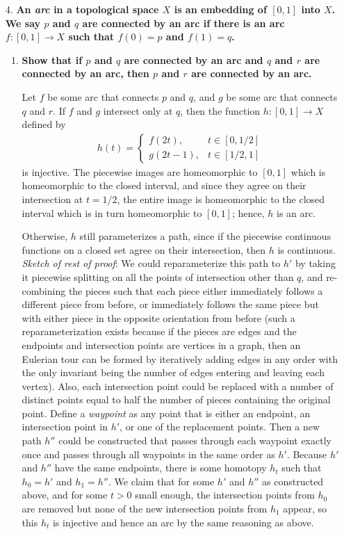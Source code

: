 \documentclass[a4paper,12pt]{article}
\begin{document}
\begin{enumerate}
    \item[4.]
        \boldmath\textbf{An \emph{arc} in a topological space $X$ is an embedding of $[0, 1]$ into $X$. We say $p$ and $q$ are connected by an arc if there is an arc $f : [0, 1] \to X$ such that $f(0) = p$ and $f(1) = q$.
        }\unboldmath \par
        \begin{enumerate}
            \item
                \boldmath\textbf{Show that if $p$ and $q$ are connected by an arc and $q$ and $r$ are connected by an arc, then $p$ and $r$ are connected by an arc.
                }\unboldmath \par
                Let $f$ be some arc that connects $p$ and $q$, and $g$ be some arc that connects $q$ and $r$. If $f$ and $g$ intersect only at $q$, then the function $h : [0, 1] \to X$ defined by
                \begin{align*}
                    h(t) = \begin{cases}
                        f(2t), &t \in [0, 1/2] \\
                        g(2t - 1), &t \in [1/2, 1]
                    \end{cases}
                \end{align*}
                is injective. The piecewise images are homeomorphic to $[0, 1]$ which is homeomorphic to the closed interval, and since they agree on their intersection at $t = 1/2$, the entire image is homeomorphic to the closed interval which is in turn homeomorphic to $[0, 1]$; hence, $h$ is an arc. \par
                Otherwise, $h$ still parameterizes a path, since if the piecewise continuous functions on a closed set agree on their intersection, then $h$ is continuous. \textit{Sketch of rest of proof}: We could reparameterize this path to $h'$ by taking it piecewise splitting on all the points of intersection other than $q$, and re-combining the pieces such that each piece either immediately follows a different piece from before, or immediately follows the same piece but with either piece in the opposite orientation from before (such a reparameterization exists because if the pieces are edges and the endpoints and intersection points are vertices in a graph, then an Eulerian tour can be formed by iteratively adding edges in any order with the only invariant being the number of edges entering and leaving each vertex). Also, each intersection point could be replaced with a number of distinct points equal to half the number of pieces containing the original point. Define a \emph{waypoint} as any point that is either an endpoint, an intersection point in $h'$, or one of the replacement points. Then a new path $h''$ could be constructed that passes through each waypoint exactly once and passes through all waypoints in the same order as $h'$. Because $h'$ and $h''$ have the same endpoints, there is some homotopy $h_t$ such that $h_0 = h'$ and $h_1 = h''$. We claim that for some $h'$ and $h''$ as constructed above, and for some $t > 0$ small enough, the intersection points from $h_0$ are removed but none of the new intersection points from $h_1$ appear, so this $h_t$ is injective and hence an arc by the same reasoning as above.

\end{enumerate}
\end{enumerate}
\end{document}
